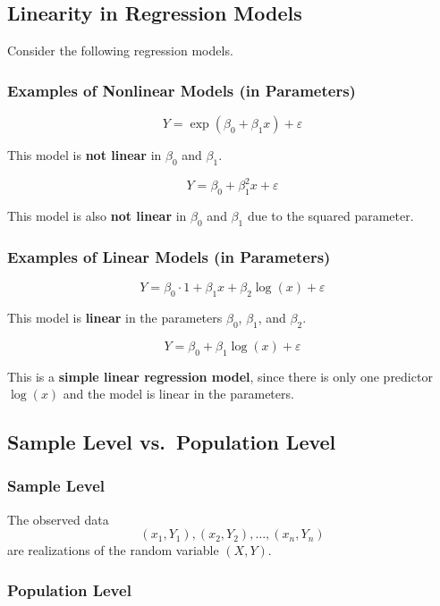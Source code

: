 \subsection{Linearity in Regression Models}

Consider the following regression models.

\subsubsection*{Examples of Nonlinear Models (in Parameters)}

\[
Y = \exp(\beta_0 + \beta_1 x) + \varepsilon
\]

This model is \textbf{not linear} in $\beta_0$ and $\beta_1$.

\[
Y = \beta_0 + \beta_1^2 x + \varepsilon
\]

This model is also \textbf{not linear} in $\beta_0$ and $\beta_1$ due to the squared parameter.

\subsubsection*{Examples of Linear Models (in Parameters)}

\[
Y = \beta_0 \cdot 1 + \beta_1 x + \beta_2 \log(x) + \varepsilon
\]

This model is \textbf{linear} in the parameters $\beta_0$, $\beta_1$, and $\beta_2$.

\[
Y = \beta_0 + \beta_1 \log(x) + \varepsilon
\]

This is a \textbf{simple linear regression model}, since there is only one predictor $\log(x)$ and the model is linear in the parameters.

\subsection{Sample Level vs.\ Population Level}

\subsubsection*{Sample Level}

The observed data
\[
(x_1, Y_1), (x_2, Y_2), \dots, (x_n, Y_n)
\]
are realizations of the random variable $(X, Y)$.

\subsubsection*{Population Level}

